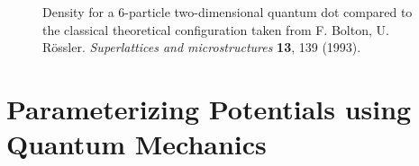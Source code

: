 \documentclass[
paper=128mm:96mm, %
fontsize=11pt, %
pagesize, %
parskip=half-, %
]{scrartcl} %
\theoremstyle{mythmstyle} %
\begin{document}
 \begin{figure}
 \begin{center}
  \label{fig:wigner20}
  \caption{Density for a 6-particle two-dimensional quantum dot compared to the classical theoretical configuration taken from F. Bolton, U. R\"{o}ssler.  \textit{Superlattices and microstructures} \textbf{13}, 139 (1993).}
 \end{center}
\end{figure}

\clearpage


\section{Parameterizing Potentials using Quantum Mechanics}
\end{document}

